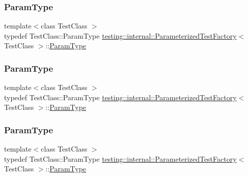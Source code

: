 \subsubsection{\texorpdfstring{ParamType}{ParamType}\hspace{0.1cm}{\footnotesize\ttfamily [1/3]}}
{\footnotesize\ttfamily template$<$class Test\+Class $>$ \\
typedef Test\+Class\+::\+Param\+Type \mbox{\hyperlink{classtesting_1_1internal_1_1_parameterized_test_factory}{testing\+::internal\+::\+Parameterized\+Test\+Factory}}$<$ Test\+Class $>$\+::\mbox{\hyperlink{classtesting_1_1internal_1_1_parameterized_test_factory_ad9a27b8e1a83de2f1687625bccff460d}{Param\+Type}}}

\mbox{\label{classtesting_1_1internal_1_1_parameterized_test_factory_ad9a27b8e1a83de2f1687625bccff460d}} 
\subsubsection{\texorpdfstring{ParamType}{ParamType}\hspace{0.1cm}{\footnotesize\ttfamily [2/3]}}
{\footnotesize\ttfamily template$<$class Test\+Class $>$ \\
typedef Test\+Class\+::\+Param\+Type \mbox{\hyperlink{classtesting_1_1internal_1_1_parameterized_test_factory}{testing\+::internal\+::\+Parameterized\+Test\+Factory}}$<$ Test\+Class $>$\+::\mbox{\hyperlink{classtesting_1_1internal_1_1_parameterized_test_factory_ad9a27b8e1a83de2f1687625bccff460d}{Param\+Type}}}

\mbox{\label{classtesting_1_1internal_1_1_parameterized_test_factory_ad9a27b8e1a83de2f1687625bccff460d}} 
\subsubsection{\texorpdfstring{ParamType}{ParamType}\hspace{0.1cm}{\footnotesize\ttfamily [3/3]}}
{\footnotesize\ttfamily template$<$class Test\+Class $>$ \\
typedef Test\+Class\+::\+Param\+Type \mbox{\hyperlink{classtesting_1_1internal_1_1_parameterized_test_factory}{testing\+::internal\+::\+Parameterized\+Test\+Factory}}$<$ Test\+Class $>$\+::\mbox{\hyperlink{classtesting_1_1internal_1_1_parameterized_test_factory_ad9a27b8e1a83de2f1687625bccff460d}{Param\+Type}}}



